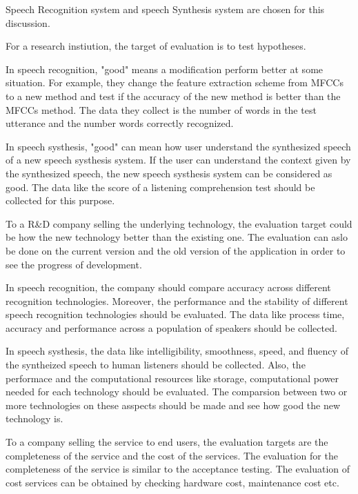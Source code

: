 \documentclass[12pt]{article}
\newenvironment{problem}[2][Problem]{\begin{trivlist}
\item[\hskip \labelsep {\bfseries #1}\hskip \labelsep {\bfseries #2.}]}{\end{trivlist}}
\begin{document}
\begin{problem}{5.2}
    Speech Recognition system and speech Synthesis system are chosen for this
    discussion.

    For a research instiution, the target of evaluation is to test hypotheses.

    In speech recognition, "good" means a modification perform better at some situation.
    For example, they change the feature extraction scheme from MFCCs to a new method
    and test if the accuracy of the new method is better than the MFCCs method.
    The data they collect is the number of words in the test utterance and
    the number words correctly recognized.

    In speech systhesis, "good" can mean how user understand the synthesized speech
    of a new speech systhesis system.
    If the user can understand the context given by the synthesized speech, the
    new speech systhesis system can be considered as good.
    The data like the score of a listening comprehension test should be collected
    for this purpose.

    To a R\&D company selling the underlying technology, the evaluation
    target could be how the new technology better than the existing one. The 
    evaluation can aslo be done on the current version and the old version of 
    the application in order to see the progress of development.

    In speech recognition, the company should compare accuracy across different 
    recognition technologies. Moreover, the performance and the stability of different 
    speech recognition technologies should be evaluated. The data like process time,
    accuracy and performance across a population of speakers should be collected.

    In speech systhesis, the data like intelligibility, smoothness, speed, and 
    fluency of the syntheized speech to human listeners should be collected. 
    Also, the performace and the computational resources like storage, computational
    power needed for each technology should be evaluated.
    The comparsion between two or more technologies on these asspects should be 
    made and see how good the new technology is.

    To a company selling the service to end users, the evaluation targets are
    the completeness of the service and the cost of the services.
    The evaluation for the completeness of the service is similar to the acceptance
    testing. The evaluation of cost services can be obtained by checking hardware
    cost, maintenance cost etc.


\end{problem}
\end{document}
